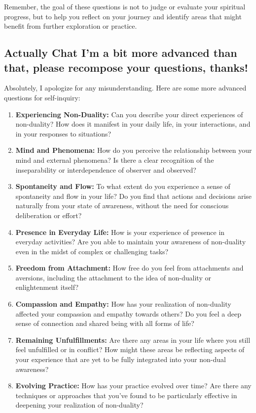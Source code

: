 \documentclass[12pt,openany]{book}
\begin{document}
Remember, the goal of these questions is not to judge or evaluate your spiritual progress, but to help you reflect on your journey and identify areas that might benefit from further exploration or practice.

\subsection*{Actually Chat I'm a bit more advanced than that, please recompose your questions, thanks!}

Absolutely, I apologize for any misunderstanding. Here are some more advanced questions for self-inquiry:

\begin{enumerate}
\item \textbf{Experiencing Non-Duality:} Can you describe your direct experiences of non-duality? How does it manifest in your daily life, in your interactions, and in your responses to situations?
\item \textbf{Mind and Phenomena:} How do you perceive the relationship between your mind and external phenomena? Is there a clear recognition of the inseparability or interdependence of obser\-ver and observed?
\item \textbf{Spontaneity and Flow:} To what extent do you experience a \linebreak sense of spontaneity and flow in your life? Do you find that actions and decisions arise naturally from your state of awareness, without the need for conscious deliberation or effort?
\item \textbf{Presence in Everyday Life:} How is your experience of presence in everyday activities? Are you able to maintain your awareness of non-duality even in the midst of complex or challenging \linebreak tasks?
\item \textbf{Freedom from Attachment:} How free do you feel from attachments and aversions, including the attachment to the idea of non-duality or enlightenment itself?
\item \textbf{Compassion and Empathy:} How has your realization of non-duality affected your compassion and empathy towards others? Do you feel a deep sense of connection and shared being with all forms of life?
\item \textbf{Remaining Unfulfillments:} Are there any areas in your life \linebreak where you still feel unfulfilled or in conflict? How might these areas be reflecting aspects of your experience that are yet to be fully integrated into your non-dual awareness?
\item \textbf{Evolving Practice:} How has your practice evolved over time? Are there any techniques or approaches that you've found to be particularly effective in deepening your realization of non-duality?
\end{enumerate}
\end{document}
